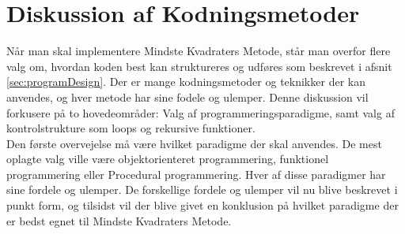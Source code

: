 \section{Diskussion af Kodningsmetoder}\label{sec:Kodningsmetoder}
Når man skal implementere Mindste Kvadraters Metode, står man overfor flere valg om, hvordan koden best kan struktureres og udføres som beskrevet i afsnit \ref{sec:programDesign}. Der er mange kodningsmetoder og teknikker der kan anvendes, og hver metode har sine fodele og ulemper. Denne diskussion vil forkusere på to hovedeområder: Valg af programmeringsparadigme, samt valg af kontrolstrukture som loops og rekursive funktioner. \\
Den første overvejelse må være hvilket paradigme der skal anvendes. De mest oplagte valg ville være objektorienteret programmering, funktionel programmering eller Procedural programmering. Hver af disse paradigmer har sine fordele og ulemper. De forskellige fordele og ulemper vil nu blive beskrevet i punkt form, og tilsidst vil der blive givet en konklusion på hvilket paradigme der er bedst egnet til Mindste Kvadraters Metode. 
